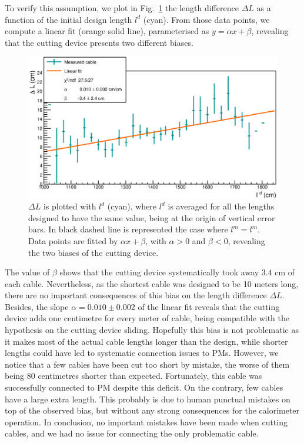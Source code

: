 To verify this assumption, we plot in Fig.~\ref{fig:CutBias} the length difference $\Delta L$ as a function of the initial design length $l^{d}$ (cyan).
From those data points, we compute a linear fit (orange solid line), parameterised as $y = \alpha x + \beta$, revealing that the cutting device presents two different biases.
\begin{figure}[h!]
  \centering
  \includegraphics[width=15cm]{commissioning/fig_commissioning/cut_biais.eps}

  \caption{$\Delta L$ is plotted with $l^{d}$ (cyan), where $l^{d}$ is averaged for all the lengths designed to have the same value, being at the origin of vertical error bars.
    In black dashed line is represented the case where $l^{m} = l^{m}$.
    Data points are fitted by $\alpha x + \beta$, with $\alpha > 0$ and $\beta < 0$, revealing the two biases of the cutting device.
    \label{fig:CutBias}}
\end{figure}
The value of $\beta$ shows that the cutting device systematically took away $3.4$ cm of each cable.
Nevertheless, as the shortest cable was designed to be 10 meters long, there are no important consequences of this bias on the length difference $\Delta L$.
Besides, the slope $\alpha = 0.010\pm 0.002$ of the linear fit reveals that the cutting device adds one centimetre for every meter of cable, being compatible with the hypothesis on the cutting device sliding.
Hopefully this bias is not problematic as it makes most of the actual cable lengths longer than the design, while shorter lengths could have led to systematic connection issues to PMs.
However, we notice that a few cables have been cut too short by mistake, the worse of them being $80$ centimetres shorter than expected.
Fortunately, this cable  was successfully connected to PM despite this deficit.
On the contrary, few cables have a large extra length.
This probably is due to human punctual mistakes on top of the observed bias, but without any strong consequences for the calorimeter operation.
In conclusion, no important mistakes have been made when cutting cables, and we had no issue for connecting the only problematic cable.

